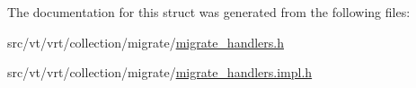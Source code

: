 The documentation for this struct was generated from the following files\+:\begin{DoxyCompactItemize}
\item 
src/vt/vrt/collection/migrate/\hyperlink{migrate__handlers_8h}{migrate\+\_\+handlers.\+h}\item 
src/vt/vrt/collection/migrate/\hyperlink{migrate__handlers_8impl_8h}{migrate\+\_\+handlers.\+impl.\+h}\end{DoxyCompactItemize}
